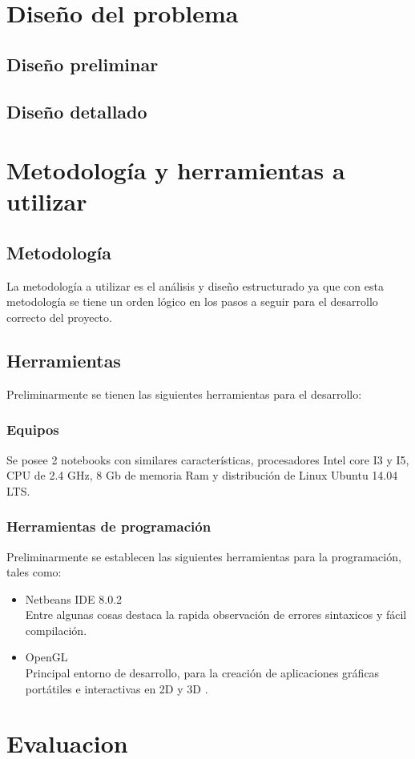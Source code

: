 \documentclass[12pt,journal,compsoc]{IEEEtran}
\begin{document}
\section{Diseño del problema}
\subsection{Diseño preliminar}
\subsection{Diseño detallado}
\section{Metodología y herramientas a utilizar}
\subsection{Metodología}
La metodología a utilizar es el análisis y diseño estructurado ya que con esta metodología se tiene un orden lógico en los pasos a seguir para el desarrollo correcto del proyecto.
\subsection{Herramientas}
Preliminarmente se tienen las siguientes herramientas para el desarrollo:
\subsubsection{Equipos}
Se posee 2 notebooks con similares características, procesadores Intel core I3 y I5, CPU de 2.4 GHz, 8 Gb de memoria Ram y distribución de Linux Ubuntu 14.04 LTS.
\subsubsection{Herramientas de programación}
Preliminarmente se establecen las siguientes herramientas para la programación, tales como:
\begin{itemize}
 \item Netbeans IDE 8.0.2\\
 	Entre algunas cosas destaca la rapida observación de errores sintaxicos y fácil compilación.
 \item OpenGL\\
 	Principal entorno de desarrollo, para la creación de aplicaciones gráficas portátiles e interactivas en
 	2D y 3D \cite{opengl}.
\end{itemize}
\section{Evaluacion}
\end{document}
